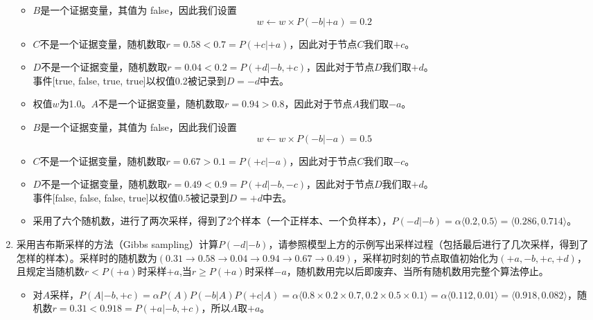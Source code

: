 \begin{enumerate}
\begin{solution}
\begin{itemize}
            \item $B$是一个证据变量，其值为 false，因此我们设置
            \begin{equation*}
                w\leftarrow w\times P(-b|+a) = 0.2
            \end{equation*}
            \item $C$不是一个证据变量，随机数取$r=0.58<0.7=P(+c|+a)$，因此对于节点$C$我们取$+c$。
            \item $D$不是一个证据变量，随机数取$r=0.04<0.2=P(+d| -b,+c)$，因此对于节点$D$我们取$+d$。\\
            事件[true, false, true, true]以权值0.2被记录到$D=-d$中去。
            \item 权值$w$为1.0。$A$不是一个证据变量，随机数取$r=0.94>0.8$，因此对于节点$A$我们取$-a$。
            \item $B$是一个证据变量，其值为 false，因此我们设置
            \begin{equation*}
                w\leftarrow w\times P(-b|-a) = 0.5
            \end{equation*}
            \item $C$不是一个证据变量，随机数取$r=0.67>0.1=P(+c|-a)$，因此对于节点$C$我们取$-c$。
            \item $D$不是一个证据变量，随机数取$r=0.49<0.9=P(+d| -b,-c)$，因此对于节点$D$我们取$+d$。\\
            事件[false, false, false, true]以权值0.5被记录到$D=+d$中去。
            \item 采用了六个随机数，进行了两次采样，得到了2个样本（一个正样本、一个负样本），$P(-d|-b)=\alpha\langle0.2,0.5\rangle=\langle 0.286, 0.714\rangle$。
        \end{itemize}
    \end{solution}
    \item 采用吉布斯采样的方法（Gibbs sampling）计算$P(-d|-b)$，请参照模型上方的示例写出采样过程（包括最后进行了几次采样，得到了怎样的样本）。采样时的随机数为$(0.31\rightarrow 0.58\rightarrow 0.04 \rightarrow 0.94 \rightarrow 0.67 \rightarrow 0.49)$，采样初时刻的节点取值初始化为$(+a, -b, +c, +d)$，且规定当随机数$r<P(+a)$时采样$+a$,当$r\geq P(+a)$时采样$-a$，随机数用完以后即废弃、当所有随机数用完整个算法停止。
    \begin{solution}
        \begin{itemize}
            固定$B=-b$，其余变量已经被初始化为$(+a,-b,+c,+d)$。
            \item 对$A$采样，$P(A| -b,+c)=\alpha P(A)P(-b|A)P(+c|A)=\alpha\langle 0.8\times 0.2\times 0.7, 0.2\times 0.5\times 0.1 \rangle=\alpha\langle 0.112, 0.01\rangle=\langle 0.918,0.082\rangle$，随机数$r=0.31<0.918=P(+a|-b,+c)$，所以$A$取$+a$。

\end{itemize}
\end{solution}
\end{enumerate}
